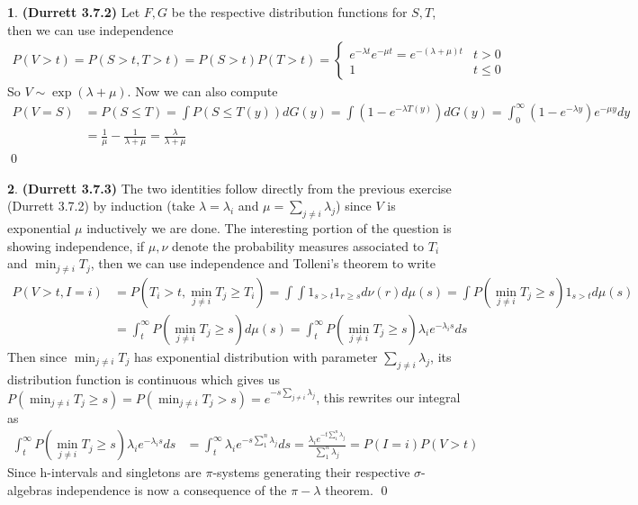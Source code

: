 \documentclass{article}
\theoremstyle{definition}
\newtheorem{pb}{}
\begin{document}
    \begin{pb} \textbf{(Durrett 3.7.2)}
        Let \(F,G\) be the respective distribution functions for \(S,T\), then we can use independence
        \begin{align*}
            P(V > t) = P(S > t, T > t) = P(S > t)P(T > t) = \begin{cases}
            e^{-\lambda t}e^{- \mu t} = e^{-(\lambda + \mu)t} & t > 0 \\
            1 & t \leq 0
            \end{cases} 
        \end{align*}
        So \(V \sim \exp(\lambda+\mu)\). Now we can also compute
        \begin{align*}
            P(V = S) &= P(S \leq T) = \int P(S \leq T(y)) dG(y) = \int (1- e^{-\lambda T(y)})dG(y) = \int_0^\infty (1-e^{-\lambda y})e^{- \mu y}dy \\
            &= \frac{1}{\mu} - \frac{1}{\lambda + \mu} = \frac{\lambda}{\lambda + \mu}
        \end{align*} \qed
    \end{pb}
    \begin{pb} \textbf{(Durrett 3.7.3)}
        The two identities follow directly from the previous exercise (Durrett 3.7.2) by induction (take \(\lambda = \lambda_i\) and \(\mu = \sum_{j \neq i} \lambda_j\)) since \(V\) is exponential \(\mu\) inductively we are done. The interesting portion of the question is showing independence, if \(\mu, \nu\) denote the probability measures associated to \(T_i\) and \(\min_{j \neq i} T_j\), then we can use independence and Tolleni's theorem to write
        \begin{align*}
            P(V > t, I = i) &= P(T_i > t, \min_{j \neq i}T_j \geq T_i) = \int\int 1_{s > t}1_{r \geq s} d\nu(r) d\mu(s) = \int P(\min_{j \neq i}T_j \geq s)1_{s > t}d\mu(s)\\ 
            & = \int_t^\infty P(\min_{j \neq i}T_j \geq s) d\mu(s)
            = \int_t^\infty P(\min_{j \neq i}T_j \geq s)\lambda_i e^{-\lambda_i s}ds
        \end{align*}
        Then since \(\min_{j \neq i}T_j\) has exponential distribution with parameter \(\sum_{j\neq i}\lambda_j\), its distribution function is continuous which gives us \(P(\min_{j \neq i}T_j \geq s) = P(\min_{j \neq i}T_j > s) = e^{-s\sum_{j \neq i}\lambda_j}\), this rewrites our integral as
        \begin{align*}
            \int_t^\infty P(\min_{j \neq i}T_j \geq s)\lambda_i e^{-\lambda_i s}ds &= \int_t^\infty \lambda_i e^{-s\sum_1^n \lambda_j}ds = \frac{\lambda_i e^{-t\sum_1^n \lambda_j}}{\sum_1^n \lambda_j} = P(I = i)P(V > t)
        \end{align*}
        Since h-intervals and singletons are \(\pi\)-systems generating their respective \(\sigma\)-algebras independence is now a consequence of the \(\pi-\lambda\) theorem. \qed
    \end{pb}
\end{document}
